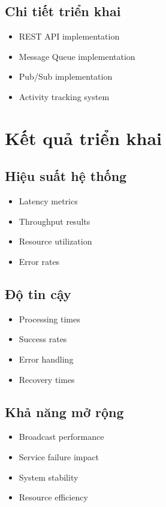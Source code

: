 \subsection{Chi tiết triển khai}
\begin{itemize}
    \item REST API implementation
    \item Message Queue implementation
    \item Pub/Sub implementation
    \item Activity tracking system
\end{itemize}

\section{Kết quả triển khai}
\subsection{Hiệu suất hệ thống}
\begin{itemize}
    \item Latency metrics
    \item Throughput results
    \item Resource utilization
    \item Error rates
\end{itemize}

\subsection{Độ tin cậy}
\begin{itemize}
    \item Processing times
    \item Success rates
    \item Error handling
    \item Recovery times
\end{itemize}

\subsection{Khả năng mở rộng}
\begin{itemize}
    \item Broadcast performance
    \item Service failure impact
    \item System stability
    \item Resource efficiency
\end{itemize}

